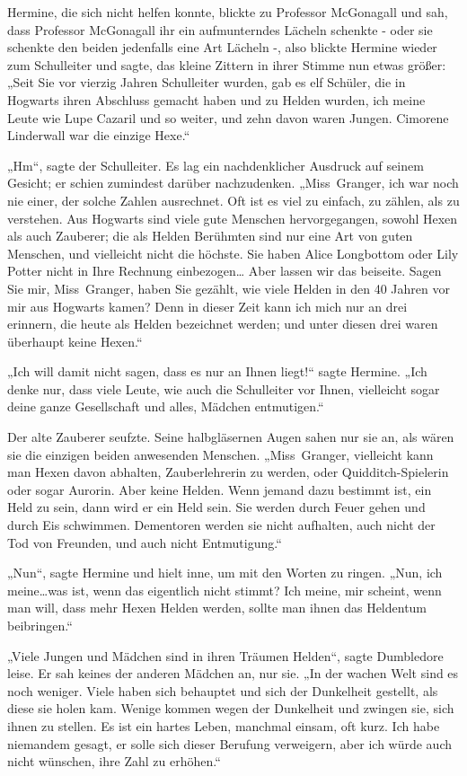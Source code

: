 {Hermine, die sich nicht helfen konnte, blickte zu Professor McGonagall und sah, dass Professor McGonagall ihr ein aufmunterndes Lächeln schenkte - oder sie schenkte den beiden jedenfalls eine Art Lächeln -, also blickte Hermine wieder zum Schulleiter und sagte, das kleine Zittern in ihrer Stimme nun etwas größer: „Seit Sie vor vierzig Jahren Schulleiter wurden, gab es elf Schüler, die in Hogwarts ihren Abschluss gemacht haben und zu Helden wurden, ich meine Leute wie Lupe Cazaril und so weiter, und zehn davon waren Jungen. Cimorene Linderwall war die einzige Hexe.“

„Hm“, sagte der Schulleiter. Es lag ein nachdenklicher Ausdruck auf seinem Gesicht; er schien zumindest darüber nachzudenken. „Miss~Granger, ich war noch nie einer, der solche Zahlen ausrechnet. Oft ist es viel zu einfach, zu zählen, als zu verstehen. Aus Hogwarts sind viele gute Menschen hervorgegangen, sowohl Hexen als auch Zauberer; die als Helden Berühmten sind nur eine Art von guten Menschen, und vielleicht nicht die höchste. Sie haben Alice Longbottom oder Lily Potter nicht in Ihre Rechnung einbezogen… Aber lassen wir das beiseite. Sagen Sie mir, Miss~Granger, haben Sie gezählt, wie viele Helden in den 40 Jahren vor mir aus Hogwarts kamen? Denn in dieser Zeit kann ich mich nur an drei erinnern, die heute als Helden bezeichnet werden; und unter diesen drei waren überhaupt keine Hexen.“

„Ich will damit nicht sagen, dass es nur an Ihnen liegt!“ sagte Hermine. „Ich denke nur, dass viele Leute, wie auch die Schulleiter vor Ihnen, vielleicht sogar deine ganze Gesellschaft und alles, Mädchen entmutigen.“

Der alte Zauberer seufzte. Seine halbgläsernen Augen sahen nur sie an, als wären sie die einzigen beiden anwesenden Menschen. „Miss~Granger, vielleicht kann man Hexen davon abhalten, Zauberlehrerin zu werden, oder Quidditch-Spielerin oder sogar Aurorin. Aber keine Helden. Wenn jemand dazu bestimmt ist, ein Held zu sein, dann wird er ein Held sein. Sie werden durch Feuer gehen und durch Eis schwimmen. Dementoren werden sie nicht aufhalten, auch nicht der Tod von Freunden, und auch nicht Entmutigung.“

„Nun“, sagte Hermine und hielt inne, um mit den Worten zu ringen. „Nun, ich meine…was ist, wenn das eigentlich nicht stimmt? Ich meine, mir scheint, wenn man will, dass mehr Hexen Helden werden, sollte man ihnen das Heldentum beibringen.“

„Viele Jungen und Mädchen sind in ihren Träumen Helden“, sagte Dumbledore leise. Er sah keines der anderen Mädchen an, nur sie. „In der wachen Welt sind es noch weniger. Viele haben sich behauptet und sich der Dunkelheit gestellt, als diese sie holen kam. Wenige kommen wegen der Dunkelheit und zwingen sie, sich ihnen zu stellen. Es ist ein hartes Leben, manchmal einsam, oft kurz. Ich habe niemandem gesagt, er solle sich dieser Berufung verweigern, aber ich würde auch nicht wünschen, ihre Zahl zu erhöhen.“

}
